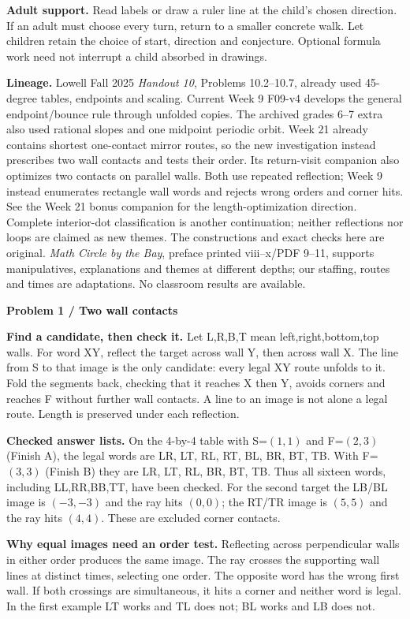 \documentclass[11pt]{article}
\newcommand{\parttitle}[1]{{\large\bfseries\color{ink}#1}\par}
\newcommand{\labelled}[2]{\textbf{#1} #2\par}
\begin{document}
\labelled{Adult support.}{Read labels or draw a ruler line at the child's chosen direction. If an adult must choose every turn, return to a smaller concrete walk. Let children retain the choice of start, direction and conjecture. Optional formula work need not interrupt a child absorbed in drawings.}
\labelled{Lineage.}{Lowell Fall 2025 \emph{Handout 10}, Problems 10.2--10.7, already used 45-degree tables, endpoints and scaling. Current Week 9 F09-v4 develops the general endpoint/bounce rule through unfolded copies. The archived grades 6--7 extra also used rational slopes and one midpoint periodic orbit. Week 21 already contains shortest one-contact mirror routes, so the new investigation instead prescribes two wall contacts and tests their order. Its return-visit companion also optimizes two contacts on parallel walls. Both use repeated reflection; Week 9 instead enumerates rectangle wall words and rejects wrong orders and corner hits. See the Week 21 bonus companion for the length-optimization direction. Complete interior-dot classification is another continuation; neither reflections nor loops are claimed as new themes. The constructions and exact checks here are original. \emph{Math Circle by the Bay}, preface printed viii--x/PDF 9--11, supports manipulatives, explanations and themes at different depths; our staffing, routes and times are adaptations. No classroom results are available.}
\newpage
\parttitle{Problem 1 / Two wall contacts}
\labelled{Find a candidate, then check it.}{Let L,R,B,T mean left,right,bottom,top walls. For word XY, reflect the target across wall Y, then across wall X. The line from S to that image is the only candidate: every legal XY route unfolds to it. Fold the segments back, checking that it reaches X then Y, avoids corners and reaches F without further wall contacts. A line to an image is not alone a legal route. Length is preserved under each reflection.}
\labelled{Checked answer lists.}{On the 4-by-4 table with S=$(1,1)$ and F=$(2,3)$ (Finish A), the legal words are LR, LT, RL, RT, BL, BR, BT, TB. With F=$(3,3)$ (Finish B) they are LR, LT, RL, BR, BT, TB. Thus all sixteen words, including LL,RR,BB,TT, have been checked. For the second target the LB/BL image is $(-3,-3)$ and the ray hits $(0,0)$; the RT/TR image is $(5,5)$ and the ray hits $(4,4)$. These are excluded corner contacts.}
\labelled{Why equal images need an order test.}{Reflecting across perpendicular walls in either order produces the same image. The ray crosses the supporting wall lines at distinct times, selecting one order. The opposite word has the wrong first wall. If both crossings are simultaneous, it hits a corner and neither word is legal. In the first example LT works and TL does not; BL works and LB does not.}
\end{document}

